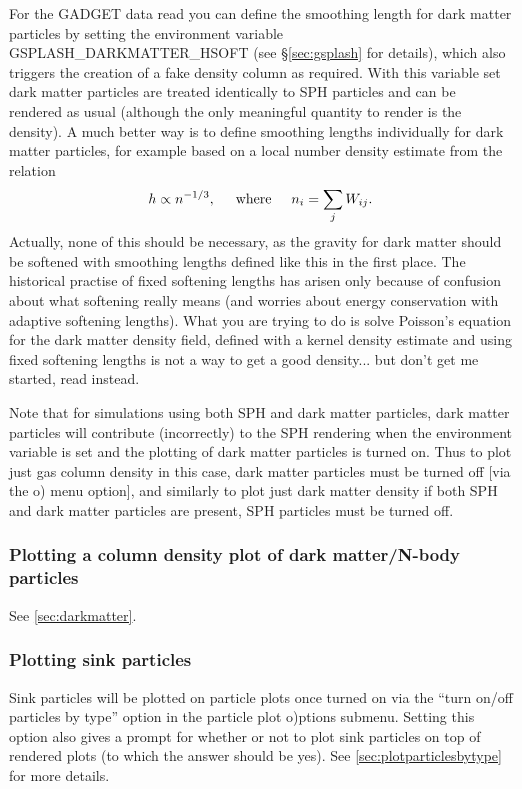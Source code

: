 \documentclass[a4paper,10pt]{article}
\begin{document}
 For the GADGET data read you can define the smoothing length for dark matter particles by setting the environment variable GSPLASH\_DARKMATTER\_HSOFT (see \S\ref{sec:gsplash} for details), which also triggers the creation of a fake density column as required. With this variable set dark matter particles are treated identically to SPH particles and can be rendered as usual (although the only meaningful quantity to render is the density). A much better way is to define smoothing lengths individually for dark matter particles, for example based on a local number density estimate from the relation
\begin{equation}
h \propto n^{-1/3}, \hspace{0.5cm} \textrm{where} \hspace{0.5cm} n_{i} = \sum_{j} W_{ij}.
\end{equation}
Actually, none of this should be necessary, as the gravity for dark matter should be softened with smoothing lengths defined like this in the first place. The historical practise of fixed softening lengths has arisen only because of confusion about what softening really means (and worries about energy conservation with adaptive softening lengths). What you are trying to do is solve Poisson's equation for the dark matter density field, defined with a kernel density estimate and using fixed softening lengths is not a way to get a good density... but don't get me started, read \citet{pm07} instead.
 
  Note that for simulations using both SPH and dark matter particles, dark matter particles will contribute (incorrectly) to the SPH rendering when the environment variable is set and the plotting of dark matter particles is turned on. Thus to plot just gas column density in this case, dark matter particles must be turned off [via the o) menu option], and similarly to plot just dark matter density if both SPH and dark matter particles are present, SPH particles must be turned off.
 
\subsubsection{ Plotting a column density plot of dark matter/N-body particles}
 See \ref{sec:darkmatter}.

\subsubsection{ Plotting sink particles}
\label{sec:plotsinks}
 Sink particles will be plotted on particle plots once turned on via the ``turn on/off particles by type'' option in the particle plot o)ptions submenu. Setting this option also gives a prompt for whether or not to plot sink particles on top of rendered plots (to which the answer should be yes).  See \ref{sec:plotparticlesbytype} for more details.
 
\end{document}
